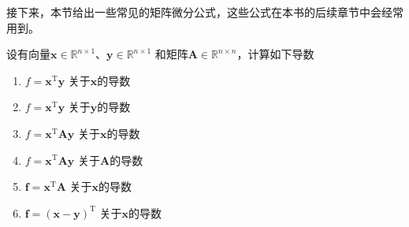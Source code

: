 接下来，本节给出一些常见的矩阵微分公式，这些公式在本书的后续章节中会经常用到。

\begin{example}
    设有向量\( \bm{x} \in \mathbb{R}^{n \times 1} \)、\( \bm{y} \in \mathbb{R}^{n \times 1} \) 和矩阵\( \mathbf{A} \in \mathbb{R}^{n \times n} \)，计算如下导数
    \begin{enumerate}
        \item \( f = \bm{x}^{\mathrm{T}} \bm{y} \) 关于\( \bm{x} \)的导数
        \item \( f = \bm{x}^{\mathrm{T}} \bm{y} \) 关于\( \bm{y} \)的导数
        \item \( f = \bm{x}^{\mathrm{T}} \mathbf{A} \bm{y} \) 关于\( \bm{x} \)的导数
        \item \( f = \bm{x}^{\mathrm{T}} \mathbf{A} \bm{y} \) 关于\( \mathbf{A} \)的导数
        \item \( \bm{f} = \bm{x}^{\mathrm{T}} \mathbf{A} \) 关于\( \bm{x} \)的导数
        \item \( \bm{f} = (\bm{x} - \bm{y})^{\mathrm{T}} \) 关于\( \bm{x} \)的导数
    \end{enumerate}
\end{example}
